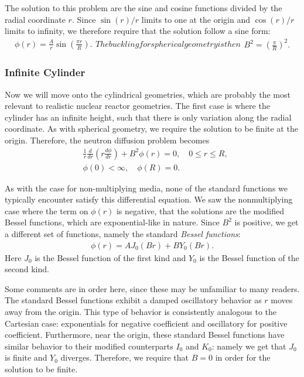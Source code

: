 The solution to this problem are the sine and cosine functions divided by the radial coordinate $r$. Since $\sin(r)/r$ limits to one at the origin and $\cos(r)/r$ limits to infinity, we therefore require that the solution follow a sine form:
\begin{subequations}
\begin{align}
  \phi(r) = \frac{A}{r} \sin\left( \frac{\pi r}{R} \right) .
\end{align}
The buckling for spherical geometry is then
\begin{align}
 B^2 = \left( \frac{\pi}{R} \right)^2 .
\end{align}
\end{subequations}

\subsubsection{Infinite Cylinder}

Now we will move onto the cylindrical geometries, which are probably the most relevant to realistic nuclear reactor geometries. The first case is where the cylinder has an infinite height, such that there is only variation along the radial coordinate. As with spherical geometry, we require the solution to be finite at the origin. Therefore, the neutron diffusion problem becomes
\begin{subequations}
\begin{align}
  &\frac{1}{r} \frac{d}{dr} \left( r \frac{d\phi}{dr} \right) + B^2 \phi(r) = 0, \quad 0 \le r \le R, \\
  &\phi(0) < \infty, \quad \phi(R) = 0.
\end{align}
\end{subequations}

As with the case for non-multiplying media, none of the standard functions we typically encounter satisfy this differential equation. We saw the nonmultiplying case where the term on $\phi(r)$ is negative, that the solutions are the modified Bessel functions, which are exponential-like in nature. Since $B^2$ is positive, we get a different set of functions, namely the standard \emph{Bessel functions}:
\begin{align}
  \phi(r) = A J_0 \left( Br \right) + B Y_0 \left( B r \right) .
\end{align}
Here $J_0$ is the Bessel function of the first kind and $Y_0$ is the Bessel function of the second kind. 

Some comments are in order here, since these may be unfamiliar to many readers. The standard Bessel functions exhibit a damped oscillatory behavior as $r$ moves away from the origin. This type of behavior is consistently analogous to the Cartesian case: exponentials for negative coefficient and oscillatory for positive coefficient. Furthermore, near the origin, these standard Bessel functions have similar behavior to their modified counterparts $I_0$ and $K_0$: namely we get that $J_0$ is finite and $Y_0$ diverges. Therefore, we require that $B = 0$ in order for the solution to be finite. 


